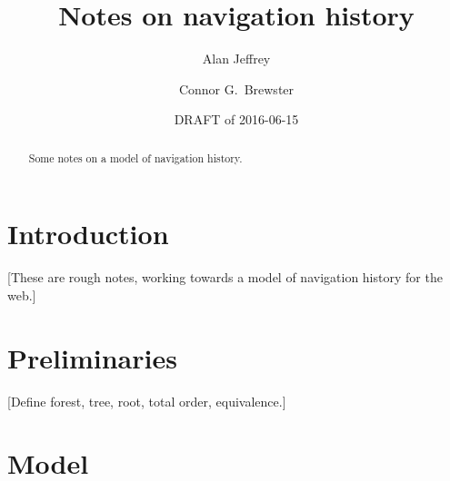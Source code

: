 \documentclass{article}
\title{Notes on navigation history}
\author{%
  Alan Jeffrey
  \and
  Connor G.~Brewster
}
\date{DRAFT of 2016-06-15}
\begin{document}
\maketitle

\begin{abstract}
  Some notes on a model of navigation history.
\end{abstract}

\section{Introduction}

[These are rough notes, working towards a model of navigation history for the web.]

\section{Preliminaries}

[Define forest, tree, root, total order, equivalence.]

\section{Model}
\end{document}
